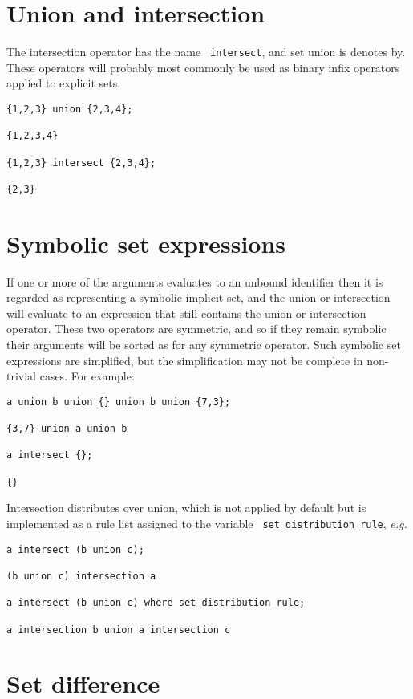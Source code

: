\section{Union and intersection}

The intersection operator has the name {\tt
intersect}, and set union is denotes by.
These operators will probably most commonly be used as binary infix
operators applied to explicit sets,

\begin{verbatim}
{1,2,3} union {2,3,4};

{1,2,3,4}

{1,2,3} intersect {2,3,4};

{2,3}
\end{verbatim}


\section{Symbolic set expressions}

If one or more of the arguments evaluates to an unbound identifier
then it is regarded as representing a symbolic implicit set, and the
union or intersection will evaluate to an expression that still
contains the union or intersection operator.  These two operators are
symmetric, and so if they remain symbolic their arguments will be
sorted as for any symmetric operator.  Such symbolic set expressions
are simplified, but the simplification may not be complete in
non-trivial cases.  For example:
\begin{verbatim}
a union b union {} union b union {7,3};

{3,7} union a union b

a intersect {};

{}
\end{verbatim}
Intersection distributes over union, which is not applied by default
but is implemented as a rule list assigned to the variable {\tt
set\_distribution\_rule}, {\em e.g.}
\begin{verbatim}
a intersect (b union c);

(b union c) intersection a

a intersect (b union c) where set_distribution_rule;

a intersection b union a intersection c
\end{verbatim}

\section{Set difference}

